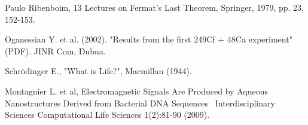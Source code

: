 \documentclass[a4paper,9pt]{article}
\begin{document}
\begin{thebibliography}{99}
 Paulo Ribenboim, 13 Lectures on Fermat's Last Theorem, Springer, 1979, pp. 23, 152-153.

 Oganessian Y. et al. (2002). "Results from the first 249Cf + 48Ca experiment" (PDF). JINR Com, Dubna.

 Schrödinger E., "What is Life?", Macmillan (1944). 

 Montagnier L. et al, Electromagnetic Signals Are Produced by Aqueous Nanostructures Derived from Bacterial DNA Sequences  Interdisciplinary Sciences Computational Life Sciences 1(2):81-90 (2009).

 




\end{thebibliography}
\end{document}
